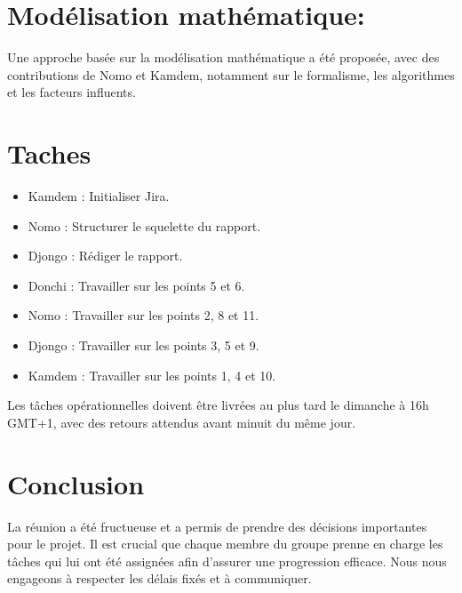\documentclass{article}
\begin{document}
\section{Modélisation mathématique:}
Une approche basée sur la modélisation mathématique a été proposée, avec des contributions de Nomo et Kamdem, notamment sur le formalisme, les algorithmes et les facteurs influents.


\section{Taches}
\begin{itemize}
    \item Kamdem : Initialiser Jira.
    \item Nomo : Structurer le squelette du rapport.
    \item Djongo : Rédiger le rapport.
    \item Donchi : Travailler sur les points 5 et 6.
    \item Nomo : Travailler sur les points 2, 8 et 11.
    \item Djongo : Travailler sur les points 3, 5 et 9.
    \item Kamdem : Travailler sur les points 1, 4 et 10.
\end{itemize}

Les tâches opérationnelles doivent être livrées au plus tard le dimanche à 16h GMT+1, avec des retours attendus avant minuit du même jour.

\newpage

\section*{Conclusion}
La réunion a été fructueuse et a permis de prendre des décisions importantes pour le projet. Il est crucial que chaque membre du groupe prenne en charge les tâches qui lui ont été assignées afin d'assurer une progression efficace. Nous nous engageons à respecter les délais fixés et à communiquer.
\enddocument 
\end{document}
